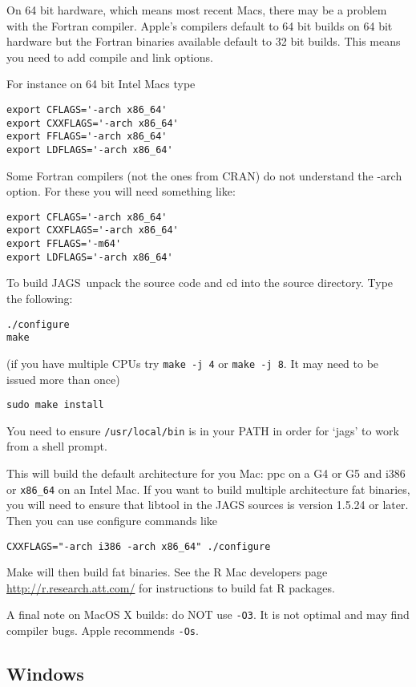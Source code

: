 \documentclass[11pt, a4paper, titlepage]{report}
\newcommand{\JAGS}{\textsf{JAGS}}
\begin{document}
On 64 bit hardware, which means most recent Macs, there may be a 
problem with the Fortran compiler.  Apple's compilers default to 64 bit 
builds on 64 bit hardware but the Fortran binaries available default to 
32 bit builds. This means you need to add compile and link options.

For instance on 64 bit Intel Macs type
\begin{verbatim}
export CFLAGS='-arch x86_64'
export CXXFLAGS='-arch x86_64'
export FFLAGS='-arch x86_64'
export LDFLAGS='-arch x86_64'
\end{verbatim}

Some Fortran compilers (not the ones from CRAN) do not understand 
the -arch option. For these you will need something like:
\begin{verbatim}
export CFLAGS='-arch x86_64'
export CXXFLAGS='-arch x86_64'
export FFLAGS='-m64'
export LDFLAGS='-arch x86_64'
\end{verbatim}

To build \JAGS\ unpack the source code and cd into the source  
directory. Type the following:
\begin{verbatim}
./configure
make
\end{verbatim}
(if you have multiple CPUs try \verb+make -j 4+ or
\verb+make -j 8+. It may need to be issued more than once)
\begin{verbatim}
sudo make install
\end{verbatim}

You need to ensure \texttt{/usr/local/bin} is in your PATH in order
for `jags' to work from a shell prompt.

This will build the default architecture for you Mac: ppc on a G4 or
G5 and i386 or \verb+x86_64+ on an Intel Mac.  If you want to build
multiple architecture fat binaries, you will need to ensure that
libtool in the JAGS sources is version 1.5.24 or later.  Then you can
use configure commands like
\begin{verbatim}
CXXFLAGS="-arch i386 -arch x86_64" ./configure
\end{verbatim}

Make will then build fat binaries.  See the R Mac developers page 
\url{http://r.research.att.com/} for instructions to build fat R packages.

A final note on MacOS X builds: do NOT use \texttt{-O3}.  It is not optimal 
and may find compiler bugs.  Apple recommends \texttt{-Os}.

\subsection{Windows}
\label{section:windows}
\end{document}
